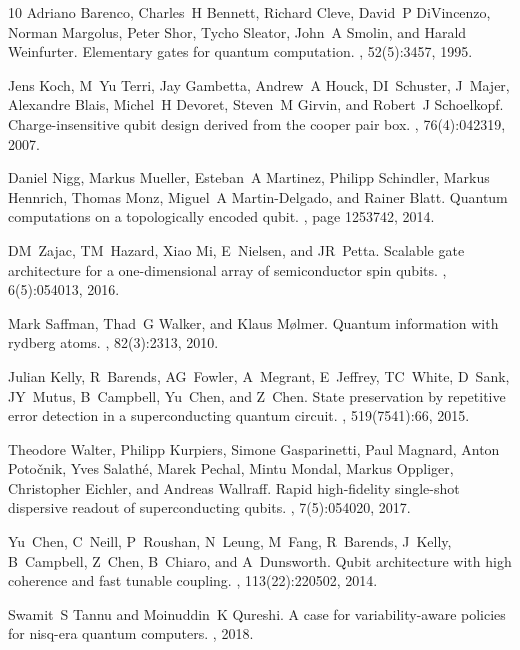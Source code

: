\documentclass[journal,10pt,twocolumn]{IEEEtran}
\begin{document}
\begin{thebibliography}{10}
Adriano Barenco, Charles~H Bennett, Richard Cleve, David~P DiVincenzo, Norman
  Margolus, Peter Shor, Tycho Sleator, John~A Smolin, and Harald Weinfurter.
\newblock Elementary gates for quantum computation.
, 52(5):3457, 1995.

Jens Koch, M~Yu Terri, Jay Gambetta, Andrew~A Houck, DI~Schuster, J~Majer,
  Alexandre Blais, Michel~H Devoret, Steven~M Girvin, and Robert~J Schoelkopf.
\newblock Charge-insensitive qubit design derived from the cooper pair box.
, 76(4):042319, 2007.

Daniel Nigg, Markus Mueller, Esteban~A Martinez, Philipp Schindler, Markus
  Hennrich, Thomas Monz, Miguel~A Martin-Delgado, and Rainer Blatt.
\newblock Quantum computations on a topologically encoded qubit.
, page 1253742, 2014.

DM~Zajac, TM~Hazard, Xiao Mi, E~Nielsen, and JR~Petta.
\newblock Scalable gate architecture for a one-dimensional array of
  semiconductor spin qubits.
, 6(5):054013, 2016.

Mark Saffman, Thad~G Walker, and Klaus M{\o}lmer.
\newblock Quantum information with rydberg atoms.
, 82(3):2313, 2010.

Julian Kelly, R~Barends, AG~Fowler, A~Megrant, E~Jeffrey, TC~White, D~Sank,
  JY~Mutus, B~Campbell, Yu~Chen, and Z~Chen.
\newblock State preservation by repetitive error detection in a superconducting
  quantum circuit.
, 519(7541):66, 2015.

Theodore Walter, Philipp Kurpiers, Simone Gasparinetti, Paul Magnard, Anton
  Poto{\v{c}}nik, Yves Salath{\'e}, Marek Pechal, Mintu Mondal, Markus
  Oppliger, Christopher Eichler, and Andreas Wallraff.
\newblock Rapid high-fidelity single-shot dispersive readout of superconducting
  qubits.
, 7(5):054020, 2017.

Yu~Chen, C~Neill, P~Roushan, N~Leung, M~Fang, R~Barends, J~Kelly, B~Campbell,
  Z~Chen, B~Chiaro, and A~Dunsworth.
\newblock Qubit architecture with high coherence and fast tunable coupling.
, 113(22):220502, 2014.

Swamit~S Tannu and Moinuddin~K Qureshi.
\newblock A case for variability-aware policies for nisq-era quantum computers.
, 2018.


\end{thebibliography}
\end{document}
